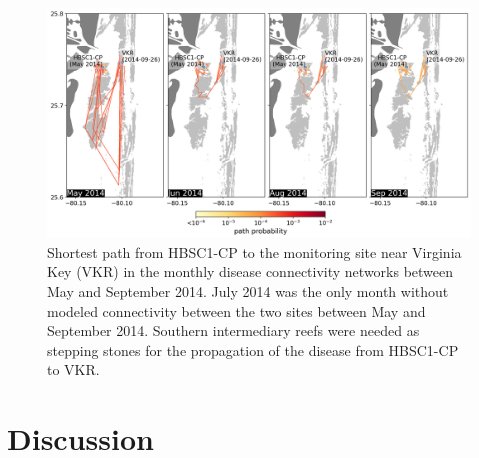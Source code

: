 \documentclass[preprint,12pt,authoryear]{elsarticle}
\begin{document}
\begin{figure}
	\centering
	\includegraphics[width=\textwidth]{figures/fig_paths_new.png}
	\caption{Shortest path from HBSC1-CP to the monitoring site near Virginia Key (VKR) in the monthly disease connectivity networks between May and September 2014. July 2014 was the only month without modeled connectivity between the two sites between May and September 2014. Southern intermediary reefs were needed as stepping stones for the propagation of the disease from HBSC1-CP to VKR.}
	\label{fig:onset_path}
\end{figure}

\section{Discussion}
\end{document}
